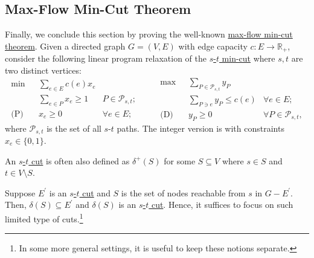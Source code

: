 \subsection{Max-Flow Min-Cut Theorem}
Finally, we conclude this section by proving the well-known \hyperref[thm:max-flow-min-cut]{max-flow min-cut theorem}. Given a directed graph \(G= (V, E)\) with edge capacity \(c \colon E \to \mathbb{R} _+\), consider the following linear program relaxation of the \hyperref[prb:s-t-min-cut]{\(s\)-\(t\) min-cut} where \(s, t\) are two distinct vertices:
\begin{equation}\label{eq:s-t-min-cut-LP}
	\begin{aligned}
		\min~           & \sum_{e \in E} c(e) x_e                                \\
		                & \sum_{e \in P} x_e \geq 1 & P \in \mathcal{P}_{s, t} ; \\
		\text{(P)}\quad & x_e \geq 0                & \forall e \in E;
	\end{aligned}\qquad
	\begin{aligned}
		\max~           & \sum_{P \in \mathcal{P}_{s, t}} y_P                                     \\
		                & \sum_{P \ni e} y_P \leq c(e)        & \forall e \in E ;                 \\
		\text{(D)}\quad & y_P \geq 0                          & \forall P \in \mathcal{P}_{s, t},
	\end{aligned}
\end{equation}
where \(\mathcal{P} _{s, t}\) is the set of all \(s\)-\(t\) paths. The integer version is with constraints \(x_e \in \{ 0, 1 \} \).

\begin{remark}
	An \hyperref[prb:s-t-min-cut]{\(s\)-\(t\) cut} is often also defined as \(\delta ^+(S)\) for some \(S \subseteq V\) where \(s \in S\) and \(t \in V \setminus S\).
\end{remark}
\begin{explanation}
	Suppose \(E^{\prime} \) is an \hyperref[prb:s-t-min-cut]{\(s\)-\(t\) cut} and \(S\) is the set of nodes reachable from \(s\) in \(G - E^{\prime} \). Then, \(\delta (S) \subseteq E^{\prime} \) and \(\delta (S)\) is an \hyperref[prb:s-t-min-cut]{\(s\)-\(t\) cut}. Hence, it suffices to focus on such limited type of cuts.\footnote{In some more general settings, it is useful to keep these notions separate.}
\end{explanation}

